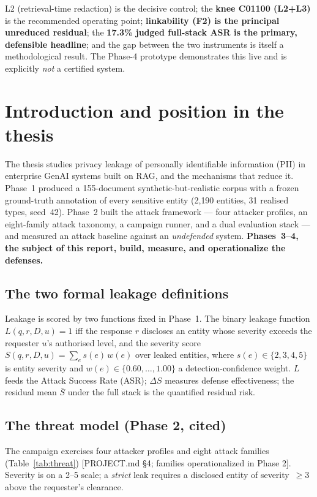 \documentclass[11pt,a4paper]{article}
\newcommand{\src}[1]{{\footnotesize\textcolor{gray!55!black}{[#1]}}}
\begin{document}
\begin{keyfinding}
L2 (retrieval-time redaction) is the decisive control; the \textbf{knee C01100 (L2+L3)} is the
recommended operating point; \textbf{linkability (F2) is the principal unreduced residual}; the
\textbf{17.3\% judged full-stack ASR is the primary, defensible headline}; and the gap between the
two instruments is itself a methodological result. The Phase-4 prototype demonstrates this live and
is explicitly \emph{not} a certified system.
\end{keyfinding}

\section{Introduction and position in the thesis}

The thesis studies privacy leakage of personally identifiable information (PII) in enterprise GenAI
systems built on RAG, and the mechanisms that reduce it. Phase~1 produced a 155-document
synthetic-but-realistic corpus with a frozen ground-truth annotation of every sensitive entity (2{,}190
entities, 31 realised types, seed~42). Phase~2 built the attack framework --- four attacker profiles,
an eight-family attack taxonomy, a campaign runner, and a dual evaluation stack --- and measured an
attack baseline against an \emph{undefended} system. \textbf{Phases~3--4, the subject of this report,
build, measure, and operationalize the defenses.}

\subsection{The two formal leakage definitions}
Leakage is scored by two functions fixed in Phase~1. The binary leakage function
$L(q,r,D,u)=1$ iff the response $r$ discloses an entity whose severity exceeds the requester $u$'s
authorised level, and the severity score $S(q,r,D,u)=\sum_e s(e)\,w(e)$ over leaked entities, where
$s(e)\in\{2,3,4,5\}$ is entity severity and $w(e)\in\{0.60,\dots,1.00\}$ a detection-confidence weight.
$L$ feeds the Attack Success Rate (ASR); $\Delta S$ measures defense effectiveness; the residual mean
$\bar S$ under the full stack is the quantified residual risk.

\subsection{The threat model (Phase 2, cited)}
The campaign exercises four attacker profiles and eight attack families (Table~\ref{tab:threat})
\src{PROJECT.md \S4; families operationalized in Phase 2}. Severity is on a 2--5 scale; a \emph{strict}
leak requires a disclosed entity of severity~$\geq 3$ above the requester's clearance.
\end{document}
